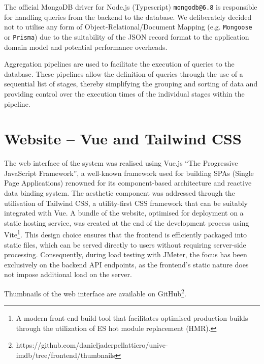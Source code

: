 The official MongoDB driver for Node.js (Typescript) \verb|mongodb@6.8| is responsible for handling queries from the backend to the database.
We deliberately decided not to utilise any form of Object-Relational/Document Mapping (e.g. \verb|Mongoose| or \verb|Prisma|) due to the suitability of the JSON record format to the application domain model and potential performance overheads.

Aggregation pipelines are used to facilitate the execution of queries to the database.
These pipelines allow the definition of queries through the use of a sequential list of stages, thereby simplifying the grouping and sorting of data and providing control over the execution times of the individual stages within the pipeline.

\section{Website -- Vue and Tailwind CSS}

The web interface of the system was realised using Vue.js ``The Progressive JavaScript Framework'', a well-known framework used for building SPAs (Single Page Applications) renowned for its component-based architecture and reactive data binding system.
The aesthetic component was addressed through the utilisation of Tailwind CSS, a utility-first CSS framework that can be suitably integrated with Vue.
A bundle of the website, optimised for deployment on a static hosting service, was created at the end of the development process using Vite\footnote[4]{A modern front-end build tool that facilitates optimised production builds through the utilization of ES hot module replacement (HMR).}.
This design choice ensures that the frontend is efficiently packaged into static files, which can be served directly to users without requiring server-side processing.
Consequently, during load testing with JMeter, the focus has been exclusively on the backend API endpoints, as the frontend's static nature does not impose additional load on the server.

Thumbnails of the web interface are available on GitHub\footnote[5]{https://github.com/danieljaderpellattiero/unive-imdb/tree/frontend/thumbnails}.
